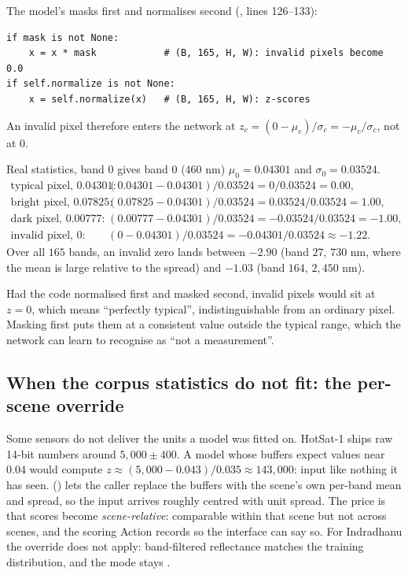 The model's  masks first and normalises second
(, lines 126--133):
\begin{lstlisting}
if mask is not None:
    x = x * mask            # (B, 165, H, W): invalid pixels become 0.0
if self.normalize is not None:
    x = self.normalize(x)   # (B, 165, H, W): z-scores
\end{lstlisting}
An invalid pixel therefore enters the network at $z_c = (0 - \mu_c)/\sigma_c = -\mu_c/\sigma_c$, not
at $0$.

\begin{worked}[label={we:bandpipeline:real}]{Real statistics, band 0}
 gives band $0$ ($460$ nm) $\mu_0 = 0.04301$ and
$\sigma_0 = 0.03524$.
\begin{align*}
\text{typical pixel, } 0.04301:&\quad (0.04301 - 0.04301)/0.03524 = 0/0.03524 = 0.00,\\
\text{bright pixel, } 0.07825:&\quad (0.07825 - 0.04301)/0.03524 = 0.03524/0.03524 = 1.00,\\
\text{dark pixel, } 0.00777:&\quad (0.00777 - 0.04301)/0.03524 = -0.03524/0.03524 = -1.00,\\
\text{invalid pixel, } 0:&\quad (0 - 0.04301)/0.03524 = -0.04301/0.03524 \approx -1.22.
\end{align*}
Over all $165$ bands, an invalid zero lands between $-2.90$ (band $27$, $730$ nm, where the mean is
large relative to the spread) and $-1.03$ (band $164$, $2{,}450$ nm)\tagC.
\end{worked}

Had the code normalised first and masked second, invalid pixels would sit at $z = 0$, which means
``perfectly typical'', indistinguishable from an ordinary pixel. Masking first puts them at a
consistent value outside the typical range, which the network can learn to recognise as ``not a
measurement''.

\subsection{When the corpus statistics do not fit: the per-scene override}

Some sensors do not deliver the units a model was fitted on. HotSat-1 ships raw 14-bit numbers
around $5{,}000 \pm 400$. A model whose buffers expect
values near $0.04$ would compute $z \approx (5{,}000 - 0.043)/0.035 \approx 143{,}000$: input like
nothing it has seen.  () lets
the caller replace the buffers with the scene's own per-band mean and spread, so the input arrives
roughly centred with unit spread. The price is that scores become \emph{scene-relative}: comparable
within that scene but not across scenes, and the scoring Action records
 so the interface can say so. For Indradhanu the
override does not apply: band-filtered reflectance matches the training distribution, and the mode
stays .


